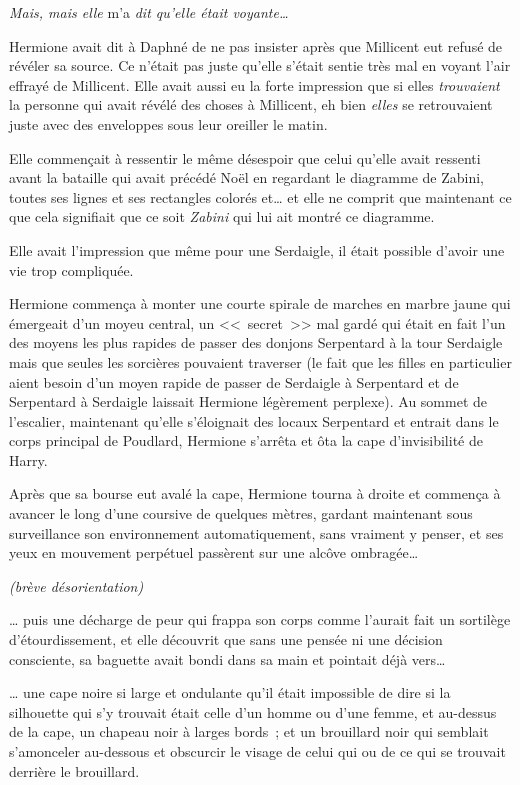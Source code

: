 \emph{Mais, mais elle} m'a \emph{dit qu'elle était voyante…}

Hermione avait dit à Daphné de ne pas insister après que Millicent eut refusé de révéler sa source. Ce n'était pas juste qu'elle s'était sentie très mal en voyant l'air effrayé de Millicent. Elle avait aussi eu la forte impression que si elles \emph{trouvaient} la personne qui avait révélé des choses à Millicent, eh bien \emph{elles} se retrouvaient juste avec des enveloppes sous leur oreiller le matin.

Elle commençait à ressentir le même désespoir que celui qu'elle avait ressenti avant la bataille qui avait précédé Noël en regardant le diagramme de Zabini, toutes ses lignes et ses rectangles colorés et… et elle ne comprit que maintenant ce que cela signifiait que ce soit \emph{Zabini} qui lui ait montré ce diagramme.

Elle avait l'impression que même pour une Serdaigle, il était possible d'avoir une vie trop compliquée.

Hermione commença à monter une courte spirale de marches en marbre jaune qui émergeait d'un moyeu central, un <<~secret~>> mal gardé qui était en fait l'un des moyens les plus rapides de passer des donjons Serpentard à la tour Serdaigle mais que seules les sorcières pouvaient traverser (le fait que les filles en particulier aient besoin d'un moyen rapide de passer de Serdaigle à Serpentard et de Serpentard à Serdaigle laissait Hermione légèrement perplexe). Au sommet de l'escalier, maintenant qu'elle s'éloignait des locaux Serpentard et entrait dans le corps principal de Poudlard, Hermione s'arrêta et ôta la cape d'invisibilité de Harry.

Après que sa bourse eut avalé la cape, Hermione tourna à droite et commença à avancer le long d'une coursive de quelques mètres, gardant maintenant sous surveillance son environnement automatiquement, sans vraiment y penser, et ses yeux en mouvement perpétuel passèrent sur une alcôve ombragée…

\emph{(brève désorientation)}

… puis une décharge de peur qui frappa son corps comme l'aurait fait un sortilège d'étourdissement, et elle découvrit que sans une pensée ni une décision consciente, sa baguette avait bondi dans sa main et pointait déjà vers…

… une cape noire si large et ondulante qu'il était impossible de dire si la silhouette qui s'y trouvait était celle d'un homme ou d'une femme, et au-dessus de la cape, un chapeau noir à larges bords~; et un brouillard noir qui semblait s'amonceler au-dessous et obscurcir le visage de celui qui ou de ce qui se trouvait derrière le brouillard.

